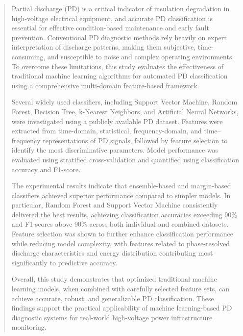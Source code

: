 \raggedbottom 



\begin{abstract}
Partial discharge (PD) is a critical indicator of insulation degradation in high-voltage electrical equipment, and accurate PD classification is essential for effective condition-based maintenance and early fault prevention. Conventional PD diagnostic methods rely heavily on expert interpretation of discharge patterns, making them subjective, time-consuming, and susceptible to noise and complex operating environments. To overcome these limitations, this study evaluates the effectiveness of traditional machine learning algorithms for automated PD classification using a comprehensive multi-domain feature-based framework.

Several widely used classifiers, including Support Vector Machine, Random Forest, Decision Tree, k-Nearest Neighbors, and Artificial Neural Networks, were investigated using a publicly available PD dataset. Features were extracted from time-domain, statistical, frequency-domain, and time--frequency representations of PD signals, followed by feature selection to identify the most discriminative parameters. Model performance was evaluated using stratified cross-validation and quantified using classification accuracy and F1-score.

The experimental results indicate that ensemble-based and margin-based classifiers achieved superior performance compared to simpler models. In particular, Random Forest and Support Vector Machine consistently delivered the best results, achieving classification accuracies exceeding 90\% and F1-scores above 90\% across both individual and combined datasets. Feature selection was shown to further enhance classification performance while reducing model complexity, with features related to phase-resolved discharge characteristics and energy distribution contributing most significantly to predictive accuracy.

Overall, this study demonstrates that optimized traditional machine learning models, when combined with carefully selected feature sets, can achieve accurate, robust, and generalizable PD classification. These findings support the practical applicability of machine learning-based PD diagnostic systems for real-world high-voltage power infrastructure monitoring.
\end{abstract}




